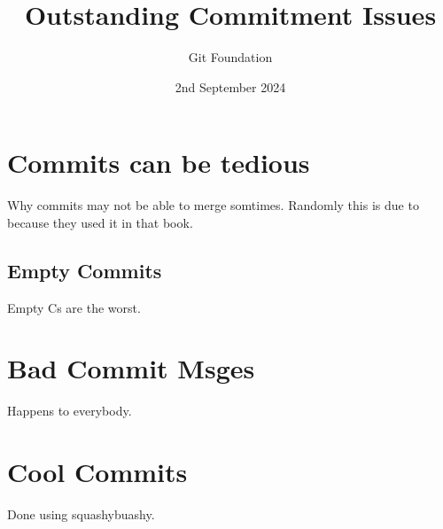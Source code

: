\documentclass{article}
\title{Outstanding Commitment Issues}
\author{Git Foundation}
\date{2nd September 2024}
\begin{document}


\maketitle
\newpage
\doublespacing
\tableofcontents
\newpage
\singlespacing
\section{Commits can be tedious}
Why commits may not be able to merge somtimes. Randomly this is due to \cite{DUMMY:1} because they used it in that book.
\subsection{Empty Commits}
Empty Cs are the worst.
\section {Bad Commit Msges}
Happens to everybody.
\section {Cool Commits}
Done using squashybuashy.


\end{document}
